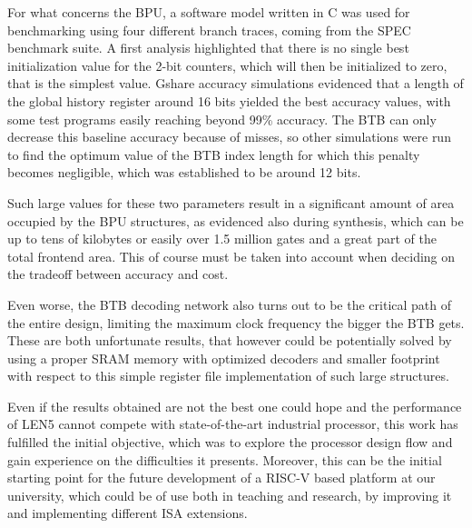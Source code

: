 \documentclass[a4paper,12pt]{article}
\begin{document}
For what concerns the BPU, a software model written in C was used for benchmarking using four different branch traces, coming from the SPEC benchmark suite. A first analysis highlighted that there is no single best initialization value for the 2-bit counters, which will then be initialized to zero, that is the simplest value. Gshare accuracy simulations evidenced that a length of the global history register around 16 bits yielded the best accuracy values, with some test programs easily reaching beyond 99\% accuracy. The BTB can only decrease this baseline accuracy because of misses, so other simulations were run to find the optimum value of the BTB index length for which this penalty becomes negligible, which was established to be around 12 bits.

Such large values for these two parameters result in a significant amount of area occupied by the BPU structures, as evidenced also during synthesis, which can be up to tens of kilobytes or easily over 1.5 million gates and a great part of the total frontend area. This of course must be taken into account when deciding on the tradeoff between accuracy and cost.

Even worse, the BTB decoding network also turns out to be the critical path of the entire design, limiting the maximum clock frequency the bigger the BTB gets. These are both unfortunate results, that however could be potentially solved by using a proper SRAM memory with optimized decoders and smaller footprint with respect to this simple register file implementation of such large structures.

Even if the results obtained are not the best one could hope and the performance of LEN5 cannot compete with state-of-the-art industrial processor, this work has fulfilled the initial objective, which was to explore the processor design flow and gain experience on the difficulties it presents. Moreover, this can be the initial starting point for the future development of a RISC-V based platform at our university, which could be of use both in teaching and research, by improving it and implementing different ISA extensions.
\end{document}
